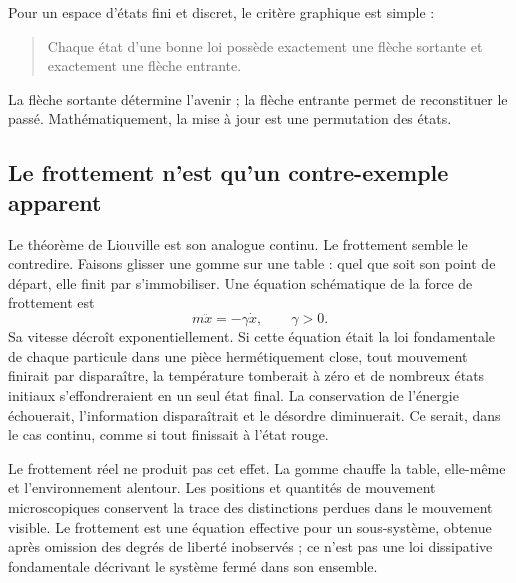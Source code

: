 Pour un espace d’états fini et discret, le critère graphique est simple :
\begin{quote}
Chaque état d’une bonne loi possède exactement une flèche sortante et exactement une flèche entrante.
\end{quote}
La flèche sortante détermine l’avenir ; la flèche entrante permet de reconstituer le passé. Mathématiquement, la mise à jour est une permutation des états.

\subsection{Le frottement n’est qu’un contre-exemple apparent}

Le théorème de Liouville est son analogue continu. Le frottement semble le contredire. Faisons glisser une gomme sur une table : quel que soit son point de départ, elle finit par s’immobiliser. Une équation schématique de la force de frottement est
\begin{equation}
 m\ddot x=-\gamma\dot x,
 \qquad \gamma>0.
 \label{eq:sm1-drag}
\end{equation}
Sa vitesse décroît exponentiellement. Si cette équation était la loi fondamentale de chaque particule dans une pièce hermétiquement close, tout mouvement finirait par disparaître, la température tomberait à zéro et de nombreux états initiaux s’effondreraient en un seul état final. La conservation de l’énergie échouerait, l’information disparaîtrait et le désordre diminuerait. Ce serait, dans le cas continu, comme si tout finissait à l’état rouge.

Le frottement réel ne produit pas cet effet. La gomme chauffe la table, elle-même et l’environnement alentour. Les positions et quantités de mouvement microscopiques conservent la trace des distinctions perdues dans le mouvement visible. Le frottement est une équation effective pour un sous-système, obtenue après omission des degrés de liberté inobservés ; ce n’est pas une loi dissipative fondamentale décrivant le système fermé dans son ensemble.

\begin{classroomqa}
\end{classroomqa}

